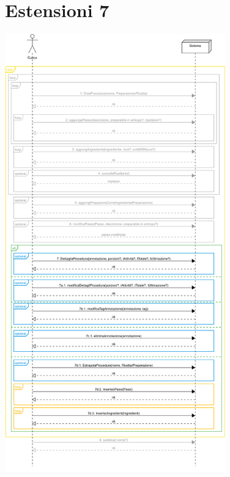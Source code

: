 \section*{Estensioni 7}
\includegraphics[max width=\textwidth, max height=190mm]{../resources/img/GRP/SSD/ext7.png}

